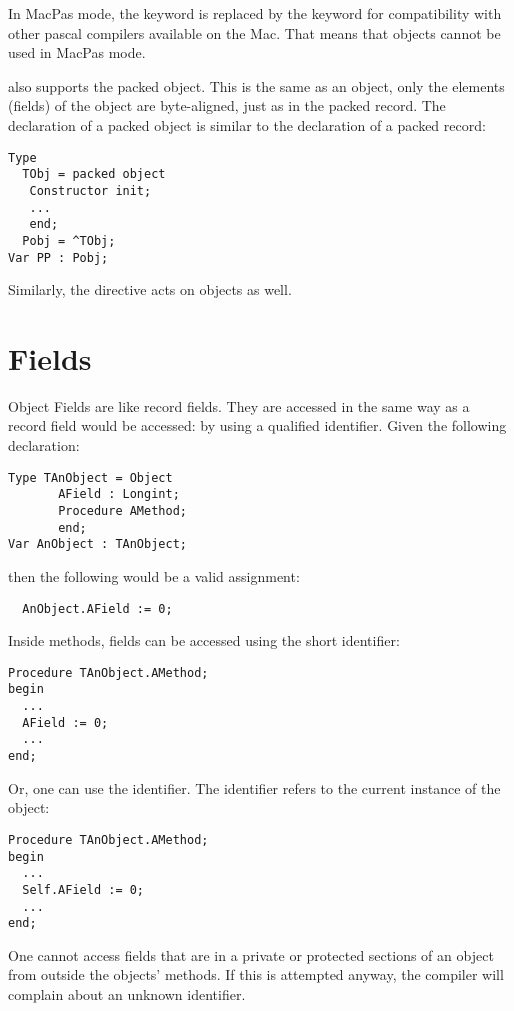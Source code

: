 \begin{remark}
In MacPas mode, the  keyword is replaced by the 
keyword for compatibility with other pascal compilers available on the Mac.
That means that objects cannot be used in MacPas mode.
\end{remark}
\begin{remark}
\fpc also supports the packed object. This is the same as an object, only
the elements (fields) of the object are byte-aligned, just as in the packed
record.
The declaration of a packed object is similar to the declaration
of a packed record:
\begin{verbatim}
Type
  TObj = packed object
   Constructor init;
   ...
   end;
  Pobj = ^TObj;
Var PP : Pobj;
\end{verbatim}
Similarly, the  directive acts on objects as well.
\end{remark}

\section{Fields}
Object Fields are like record fields. They are accessed in the same way as
a record field would be accessed: by using a qualified identifier. Given the
following declaration:
\begin{verbatim}
Type TAnObject = Object
       AField : Longint;
       Procedure AMethod;
       end;
Var AnObject : TAnObject;
\end{verbatim}
then the following would be a valid assignment:
\begin{verbatim}
  AnObject.AField := 0;
\end{verbatim}
Inside methods, fields can be accessed using the short identifier:
\begin{verbatim}
Procedure TAnObject.AMethod;
begin
  ...
  AField := 0;
  ...
end;
\end{verbatim}
Or, one can use the  identifier. The  identifier refers
to the current instance of the object:
\begin{verbatim}
Procedure TAnObject.AMethod;
begin
  ...
  Self.AField := 0;
  ...
end;
\end{verbatim}
One cannot access fields that are in a private or protected sections of an object from
outside the objects' methods. If this is attempted anyway, the compiler will complain about
an unknown identifier.

